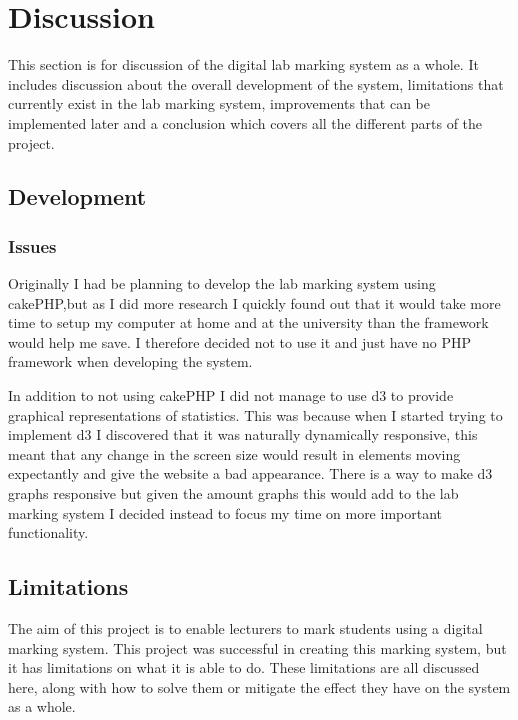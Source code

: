 \documentclass[12pt]{article}  %
\begin{document}
\newpage
\section{Discussion}

This section is for discussion of the digital lab marking system as a whole. It includes discussion about the overall development of the system, limitations that currently exist in the lab marking system, improvements that can be implemented later and a conclusion which covers all the different parts of the project.

\subsection{Development}

\subsubsection{Issues}

Originally I had be planning to develop the lab marking system using cakePHP,but as I did more research I quickly found out that it would take more time to setup my computer at home and at the university than the framework would help me save. I therefore decided  not to use it and just have no PHP framework when developing the system.

In addition to not using cakePHP I did not manage to use d3 to provide graphical representations of statistics. This was because when I started trying to implement d3 I discovered that it was naturally dynamically responsive, this meant that any change in the screen size would result in elements moving expectantly and give the website a bad appearance. There is a way to make d3 graphs responsive but given the amount graphs this would add to the lab marking system I decided instead to focus my time on more important functionality. 



\subsection{Limitations}

The aim of this project is to enable lecturers to mark students using a digital marking system. This project was successful in creating this marking system, but it has limitations on what it is able to do. These limitations are all discussed here, along with how to solve them or mitigate the effect they have on the system as a whole.
\end{document}
